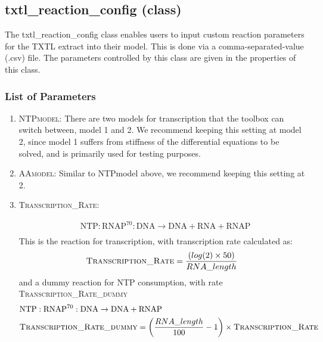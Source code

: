\documentclass[english]{report}
\begin{document}
		\subsection*{txtl\_reaction\_config (class)}
		The txtl\_reaction\_config class enables users to input custom reaction parameters for the TXTL extract into their model. This is done via a comma-separated-value (.csv) file. The parameters controlled by this class are given in the properties of this class. 
		\subsubsection*{List of Parameters}
			\begin{enumerate}
			\item \textsc{NTPmodel}: 
			There are two models for transcription that the toolbox can switch between, model 1 and 2. We recommend keeping this setting at model 2, since model 1 suffers from stiffness of the differential equations to be solved, and is primarily used for testing purposes. 
        	\item \textsc{AAmodel}: 
        	Similar to NTPmodel above, we recommend keeping this setting at 2. 
        	\item \textsc{Transcription\_Rate}:
        	
        	\begin{align}
        	& \mathrm{NTP:RNAP^{70}:DNA} \rightarrow \mathrm{DNA} + \mathrm{RNA} + \mathrm{RNAP} \\
        	\end{align}
        	This is the reaction for transcription, with transcription rate calculated as:\\
        	\begin{align}
        	& \textsc{Transcription\_Rate} = \frac{(log(2)\times50)}{RNA\_length}\\
        	\end{align}
        	\textrm{and a dummy reaction for NTP consumption, with rate \textsc{Transcription\_Rate\_dummy}} \\
        	\begin{align}
        	& \mathrm{NTP:RNAP^{70}:DNA} \rightarrow \mathrm{DNA} + \mathrm{RNAP} \\ 
        	& \textsc{Transcription\_Rate\_dummy} = \left(\frac{RNA\_length}{100}-1\right)\times\textsc{Transcription\_Rate}
        	\end{align}
        	

\end{enumerate}
\end{document}
